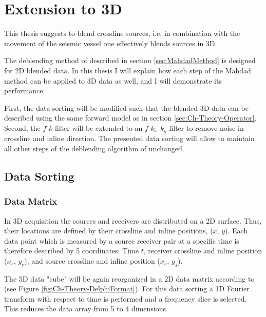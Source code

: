 \chapter{Extension to 3D} \label{chap:MahdadMethod3d}

This thesis suggests to blend crossline sources, i.e. in combination with the movement of the seismic vessel one effectively blends sources in 3D.

The deblending method of \citet{Mahdad-Deblending-Method} described in section \ref{sec:MahdadMethod} is designed for 2D blended data. In this thesis I will explain how each step of the Mahdad method can be applied to 3D data as well, and I will demonstrate its performance.

First, the data sorting will be modified such that the blended 3D data can be described using the same forward model as in section \ref{sec:Ch-Theory-Operator}. Second, the $f$-$k$-filter will be extended to an $f$-$k_x$-$k_y$-filter to remove noise in crossline and inline direction. The presented data sorting will allow to maintain all other steps of the deblending algorithm of \citet{Mahdad-Deblending-Method} unchanged.

\section{Data Sorting} \label{sec:Ch-Theory-3dExtension-DataSorting}

\subsection*{Data Matrix}

In 3D acquisition the sources and receivers are distributed on a 2D surface. Thus, their locations are defined by their crossline and inline positions, ($x$, $y$). Each data point which is measured by a source receiver pair at a specific time is therefore described by 5 coordinates: Time $t$, receiver crossline and inline position ($x_r$, $y_r$), and source crossline and inline position ($x_s$, $y_s$).

The 5D data "cube" will be again reorganized in a 2D data matrix according to \citet{Delphi-Format} (see Figure \ref{fig:Ch-Theory-DelphiFormat}). For this data sorting a 1D Fourier transform with respect to time is performed and a frequency slice is selected. This reduces the data array from 5 to 4 dimensions. 

